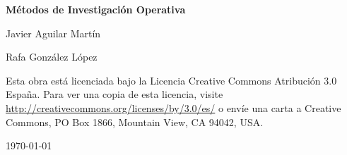 \documentclass[twoside]{report}
\begin{document}
\begin{titlepage}
	\centering
	{\huge\bfseries Métodos de Investigación Operativa \par}
	\vspace{2cm}
	{\Large Javier Aguilar Martín\par}
	{\Large Rafa González López\par}
	\vspace{2.5cm}
	\vfill
	Esta obra está licenciada bajo la Licencia Creative Commons Atribución 3.0 España. Para ver una copia de esta licencia, visite \url{http://creativecommons.org/licenses/by/3.0/es/} o envíe una carta a Creative Commons, PO Box 1866, Mountain View, CA 94042, USA.

	{\large \today\par}
\end{titlepage}

\tableofcontents



%
%
%
%
%
\end{document}
